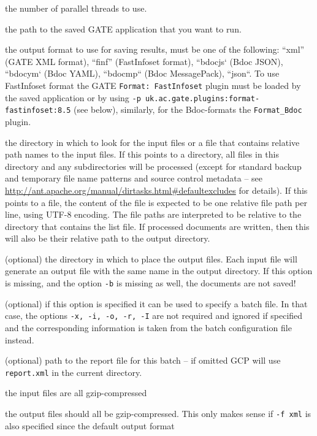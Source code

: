 \bde
\item[-t] the number of parallel threads to use.
\item[-x] the path to the saved GATE application that you want to run.
\item[-f] \sloppy the output format to use for saving results, must be one of the following:
	``xml'' (GATE XML format), ``finf'' (FastInfoset format), ``bdocjs` (Bdoc JSON),
	``bdocym` (Bdoc YAML), ``bdocmp`` (Bdoc MessagePack), ``json``. 
  To use FastInfoset format the
  GATE \verb!Format: FastInfoset! plugin must be loaded by the saved
  application or by using \verb!-p uk.ac.gate.plugins:format-fastinfoset:8.5!
  (see below), similarly,  for the Bdoc-formats the \verb!Format_Bdoc! plugin.
\item[-i] the directory in which to look for the input files or a file that contains
  relative path names to the input files. If this points to a directory, all files in
  this directory and any subdirectories will be processed (except for standard
  backup and temporary file name patterns and source control metadata -- see
  \url{http://ant.apache.org/manual/dirtasks.html#defaultexcludes} for
  details). If this points to a file, the content of the file is expected to be 
  one relative file path per line, using UTF-8 encoding. The file paths are 
  interpreted to be relative to the directory that contains the list file.
  If processed documents are written, then this will also be their relative 
  path to the output directory. 
\item[-o] (optional) the directory in which to place the output files.  Each input file
  will generate an output file with the same name in the output directory.
  If this option is missing, and the option \texttt{-b} is missing as well,
  the documents are not saved!
\item[-b] (optional) if this option is specified it can be used to specify
  a batch file. In that case, the options \texttt{-x, -i, -o, -r, -I} are 
  not required and ignored if specified and the corresponding information is
  taken from the batch configuration file instead.
\item[-r] (optional) path to the report file for this batch -- if omitted
  GCP will use \verb!report.xml! in the current directory.
\item[-ci] the input files are all gzip-compressed
\item[-co] the output files should all be gzip-compressed. This only makes
sense if \verb!-f xml! is also specified since the default output format
